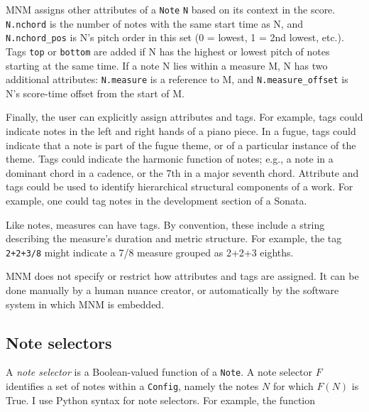 \documentclass[letterpaper, 12pt]{article}
\begin{document}
MNM assigns other attributes of a \texttt{Note} \texttt{N} based on its context in the score.
\texttt{N.nchord} is the number of notes
with the same start time as N, and \texttt{N.nchord\_pos}
is N's pitch order in this set (0 = lowest, 1 = 2nd lowest, etc.).
Tags \texttt{top} or \texttt{bottom} are added if N
has the highest or lowest pitch of notes starting at the same time.
If a note N lies within a measure M, N has two additional attributes:
\texttt{N.measure} is a reference to M,
and \texttt{N.measure\_offset} is N's score-time offset from the start of M.

Finally, the user can explicitly assign attributes and tags.
For example,
tags could indicate notes in the left and right hands
of a piano piece.
In a fugue, tags could indicate that a note is part of the fugue theme,
or of a particular instance of the theme.
Tags could indicate the harmonic function of notes;
e.g., a note in a dominant chord in a cadence,
or the 7th in a major seventh chord.
Attribute and tags could be used to identify hierarchical
structural components of a work.
For example, one could tag notes in the development section of a Sonata.

Like notes, measures can have tags.
By convention, these include a string describing the measure's
duration and metric structure.
For example, the tag \texttt{2+2+3/8} might indicate a 7/8 measure
grouped as 2+2+3 eighths.

MNM does not specify or restrict how attributes and tags are assigned.
It can be done manually by a human nuance creator,
or automatically by the software system in which MNM is embedded.

\subsection{Note selectors}

A \textit{note selector} is a Boolean-valued function of a \texttt{Note}.
A note selector $ F $ identifies a set of notes within a \texttt{Config},
namely the notes $ N $ for which $ F(N) $ is True.
I use Python syntax for note selectors.
For example, the function
\end{document}
